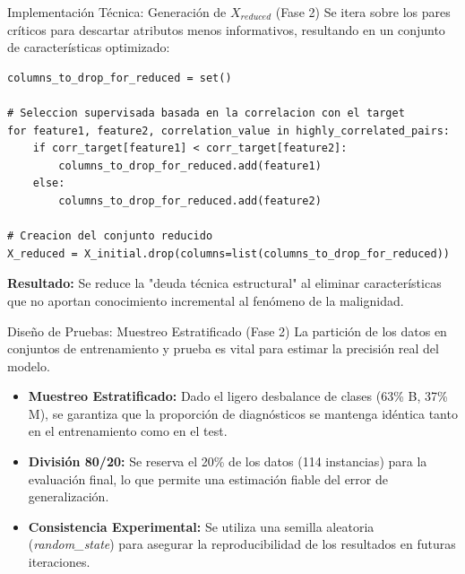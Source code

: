 \documentclass{beamer}
\begin{document}
	\begin{frame}[fragile]{Implementación Técnica: Generación de $X_{reduced}$ (Fase 2)}
		Se itera sobre los pares críticos para descartar atributos menos informativos, resultando en un conjunto de características optimizado:
		
		\begin{lstlisting}[style=colab]
columns_to_drop_for_reduced = set()

# Seleccion supervisada basada en la correlacion con el target
for feature1, feature2, correlation_value in highly_correlated_pairs:
	if corr_target[feature1] < corr_target[feature2]:
		columns_to_drop_for_reduced.add(feature1)
	else:
		columns_to_drop_for_reduced.add(feature2)

# Creacion del conjunto reducido
X_reduced = X_initial.drop(columns=list(columns_to_drop_for_reduced))
		\end{lstlisting}
		\textbf{Resultado:} Se reduce la "deuda técnica estructural" al eliminar características que no aportan conocimiento incremental al fenómeno de la malignidad.
	\end{frame}
	
	\begin{frame}{Diseño de Pruebas: Muestreo Estratificado (Fase 2)}
		La partición de los datos en conjuntos de entrenamiento y prueba es vital para estimar la precisión real del modelo.
		
		\begin{itemize}
			\item<2-> \textbf{Muestreo Estratificado:} Dado el ligero desbalance de clases (63\% B, 37\% M), se garantiza que la proporción de diagnósticos se mantenga idéntica tanto en el entrenamiento como en el test.
			\item<3-> \textbf{División 80/20:} Se reserva el 20\% de los datos (114 instancias) para la evaluación final, lo que permite una estimación fiable del error de generalización.
			\item<4-> \textbf{Consistencia Experimental:} Se utiliza una semilla aleatoria (\textit{random\_state}) para asegurar la reproducibilidad de los resultados en futuras iteraciones.
		\end{itemize}
	\end{frame}
	
\end{document}
